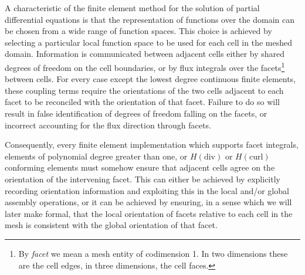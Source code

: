 \documentclass[oneeqnum,onethmnum,onefignum,onetabnum]{siamltex1213}
\newcommand{\Hdiv}{$ H( \mathrm{div} ) $}
\newcommand{\Hcurl}{$ H( \mathrm{curl} ) $}
\begin{document}
A characteristic of the finite element method for the solution of partial
differential equations is that the representation of functions over the
domain can be chosen from a wide range of function spaces.  This choice is
achieved by selecting a particular local function space to be used for each
cell in the meshed domain. Information is communicated between adjacent
cells either by shared degrees of freedom on the cell boundaries, or by flux
integrals over the facets\footnote{By \emph{facet} we mean a mesh entity of
  codimension 1. In two dimensions these are the cell edges, in three
  dimensions, the cell faces.} between cells. For every case except the
lowest degree continuous finite elements, these coupling terms require the
orientations of the two cells adjacent to each facet to be reconciled with
the orientation of that facet. Failure to do so will result in false
identification of degrees of freedom falling on the facets, or incorrect
accounting for the flux direction through facets.

Consequently, every finite element implementation which supports facet integrals, elements
of polynomial degree greater than one, or \Hdiv{} or \Hcurl{} conforming
elements must somehow ensure that adjacent cells agree on the orientation
of the intervening facet.  This can either be achieved by explicitly
recording orientation information and exploiting this in the local and/or
global assembly operations, or it can be achieved by ensuring, in a sense
which we will later make formal, that the local orientation of facets
relative to each cell in the mesh is consistent with the global orientation
of that facet.
\end{document}
